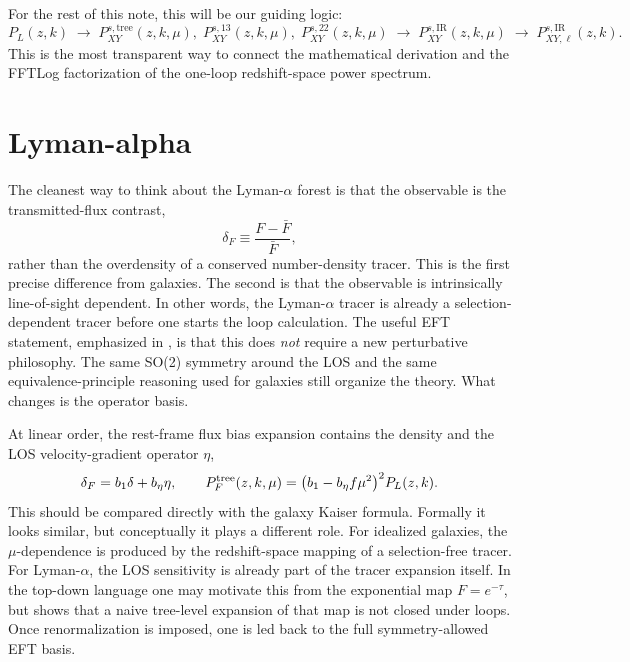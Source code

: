 \documentclass[a4paper,11pt]{article}
\renewcommand{\emph}[1]{\textit{#1}}
\newcommand{\<}{\langle}
\renewcommand{\>}{\rangle}
\begin{document}
For the rest of this note, this will be our guiding logic:
\begin{equation}
P_L(z,k)
\;\longrightarrow\;
P_{XY}^{s,\mathrm{tree}}(z,k,\mu),\;
P_{XY}^{s,13}(z,k,\mu),\;
P_{XY}^{s,22}(z,k,\mu)
\;\longrightarrow\;
P_{XY}^{s,\mathrm{IR}}(z,k,\mu)
\;\longrightarrow\;
P_{XY,\ell}^{s,\mathrm{IR}}(z,k).
\end{equation}
This is the most transparent way to connect the mathematical derivation and the FFTLog factorization of the one-loop redshift-space power spectrum.

\section{Lyman-alpha}

The cleanest way to think about the Lyman-\(\alpha\) forest is that the observable is
the transmitted-flux contrast,
\begin{equation}
\delta_F \equiv \frac{F-\bar F}{\bar F},
\end{equation}
rather than the overdensity of a conserved number-density tracer. This is the first
precise difference from galaxies. The second is that the observable is intrinsically
line-of-sight dependent. In other words, the Lyman-\(\alpha\) tracer is already a
selection-dependent tracer before one starts the loop calculation. The useful EFT
statement, emphasized in \cite{Ivanov:2023yla}, is that this does \emph{not} require
a new perturbative philosophy. The same SO(2) symmetry around the LOS and the
same equivalence-principle reasoning used for galaxies still organize the theory.
What changes is the operator basis.

At linear order, the rest-frame flux bias expansion contains the density and the
LOS velocity-gradient operator \(\eta\),
\begin{equation}
\delta_F = b_1\delta + b_\eta \eta,
\qquad
P_F^{\rm tree}(z,k,\mu)
=
\bigl(b_1-b_\eta f\mu^2\bigr)^2 P_L(z,k).
\label{eq:lya_tree_note}
\end{equation}
This should be compared directly with the galaxy Kaiser formula. Formally it looks
similar, but conceptually it plays a different role. For idealized galaxies, the
\(\mu\)-dependence is produced by the redshift-space mapping of a selection-free
tracer. For Lyman-\(\alpha\), the LOS sensitivity is already part of the tracer
expansion itself. In the top-down language one may motivate this from the
exponential map \(F=e^{-\tau}\), but \cite{Ivanov:2023yla} shows that a naive
tree-level expansion of that map is not closed under loops. Once renormalization is
imposed, one is led back to the full symmetry-allowed EFT basis.
\end{document}
